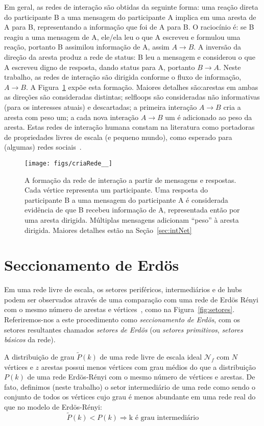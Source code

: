 \documentclass[a4paper,openright,12pt]{report} %
\begin{document}
Em geral, as redes de interação são obtidas da seguinte forma:
uma reação direta do participante B a uma mensagem do participante A implica em uma aresta de A para B,
representando a informação que foi de A para B.
O raciocínio é: se B reagiu
a uma mensagem de A, ele/ela leu o que A escreveu e formulou uma reação, portanto B
assimilou informação de A, assim $A \rightarrow B$.
A inversão da direção da aresta produz a rede de status: B leu a mensagem e considerou
o que A escreveu digno de resposta, dando status para A, portanto $B \rightarrow A$.
Neste trabalho, as redes de interação são dirigida conforme o fluxo de informação, $A \rightarrow B$.
A Figura~\ref{formationNetwork} expõe esta formação. Maiores detalhes são:arestas em ambas as direções são consideradas distintas;
selfloops são consideradas não informativas (para os interesses atuais) e descartadas;  
a primeira interação $A\rightarrow B$ cria a aresta com peso um; 
a cada nova interação $A\rightarrow B$ um é adicionado ao peso da aresta.
Estas redes de interação humana constam na literatura como portadoras
de propriedades livres de escala (e pequeno mundo), como esperado
para (algumas) redes sociais~\cite{bird,newmanBook}.

\begin{figure}[!h]
	\centering
	\texttt{[image: figs/criaRede\_\_]}
	\caption{A formação da rede de interação a partir
		de mensagens e respostas.
		Cada vértice representa um participante.
		Uma resposta do participante B a uma
		mensagem do participante A é considerada
		evidência de que B recebeu informação de A,
		representada então por uma aresta dirigida.
		Múltiplas mensagens adicionam ``peso'' à
		aresta dirigida. Maiores detalhes
		estão na Seção~\ref{sec:intNet}}
	\label{formationNetwork}
\end{figure}

\section{Seccionamento de Erdös}\label{sec:sec}
Em uma rede livre de escala, os setores periféricos, intermediários
e de hubs podem ser observados através de uma comparação
com uma rede de Erdös Rényi com o mesmo número de arestas e vértices~\cite{3setores}, como na Figura~\ref{fig:setores}.
Referiremos-nos a este procedimento como \emph{seccionamento de Erdös},
com os setores resultantes chamados \emph{setores de Erdös} (ou \emph{setores primitivos}, \emph{setores básicos} da rede).

A distribuição de grau
$\widetilde{P}(k)$
de uma rede livre de escala ideal
$\mathcal{N}_f$ com $N$ 
vértices e $z$ arestas possui menos
vértices com grau médios do que a distribuição $P(k)$
de uma rede Erdös-Rényi com o mesmo número de vértices e arestas.
De fato, definimos (neste trabalho) o setor intermediário de uma
rede como sendo o conjunto de todos os vértices cujo grau é
menos abundante em uma rede real do que no modelo de Erdös-Rényi:
\begin{equation}\label{criterio}
	\widetilde{P}(k)<P(k) \Rightarrow \text{k é grau intermediário}
\end{equation}
\end{document}
